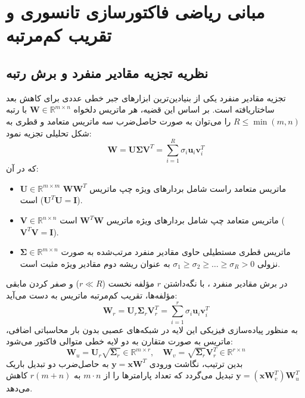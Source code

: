 \documentclass[12pt,a4paper]{report}
\theoremstyle{definition}
\begin{document}
\section{مبانی ریاضی فاکتورسازی تانسوری و تقریب کم‌مرتبه}
\subsection{نظریه تجزیه مقادیر منفرد  و برش رتبه }
تجزیه مقادیر منفرد  یکی از بنیادین‌ترین ابزارهای جبر خطی عددی برای کاهش بعد ساختاریافته است. بر اساس این قضیه، هر ماتریس دلخواه $\mathbf{W} \in \mathbb{R}^{m \times n}$ با رتبه $R \le \min(m, n)$ را می‌توان به صورت حاصل‌ضرب سه ماتریس متعامد و قطری به شکل تحلیلی تجزیه نمود:
\begin{equation}
\mathbf{W} = \mathbf{U} \mathbf{\Sigma} \mathbf{V}^T = \sum_{i=1}^R \sigma_i \mathbf{u}_i \mathbf{v}_i^T
\end{equation}
که در آن:
\begin{itemize}
    \item $\mathbf{U} \in \mathbb{R}^{m \times m}$ ماتریس متعامد راست شامل بردارهای ویژه چپ ماتریس $\mathbf{W}\mathbf{W}^T$ است ($\mathbf{U}^T\mathbf{U} = \mathbf{I}$).
    \item $\mathbf{V} \in \mathbb{R}^{n \times n}$ ماتریس متعامد چپ شامل بردارهای ویژه ماتریس $\mathbf{W}^T\mathbf{W}$ است ($\mathbf{V}^T\mathbf{V} = \mathbf{I}$).
    \item $\mathbf{\Sigma} \in \mathbb{R}^{m \times n}$ ماتریس قطری مستطیلی حاوی مقادیر منفرد مرتب‌شده به صورت نزولی $\sigma_1 \ge \sigma_2 \ge \dots \ge \sigma_R > 0$ به عنوان ریشه دوم مقادیر ویژه مثبت است.
\end{itemize}

در برش مقادیر منفرد ، با نگه‌داشتن $r$ مؤلفه نخست ($r \ll R$) و صفر کردن مابقی مؤلفه‌ها، تقریب کم‌مرتبه ماتریس به دست می‌آید:
\begin{equation}
\mathbf{W}_r = \mathbf{U}_r \mathbf{\Sigma}_r \mathbf{V}_r^T = \sum_{i=1}^r \sigma_i \mathbf{u}_i \mathbf{v}_i^T
\end{equation}
به منظور پیاده‌سازی فیزیکی این لایه در شبکه‌های عصبی بدون بار محاسباتی اضافی، ماتریس به صورت متقارن به دو لایه خطی متوالی فاکتور می‌شود:
\begin{equation}
\mathbf{W}_u = \mathbf{U}_r \sqrt{\mathbf{\Sigma}_r} \in \mathbb{R}^{m \times r}, \quad \mathbf{W}_v = \sqrt{\mathbf{\Sigma}_r} \mathbf{V}_r^T \in \mathbb{R}^{r \times n}
\end{equation}
بدین ترتیب، نگاشت ورودی $\mathbf{y} = \mathbf{x} \mathbf{W}^T$ به حاصل‌ضرب دو تبدیل باریک $\mathbf{y} = (\mathbf{x} \mathbf{W}_v^T) \mathbf{W}_u^T$ تبدیل می‌گردد که تعداد پارامترها را از $m \cdot n$ به $r(m + n)$ کاهش می‌دهد.
\end{document}
